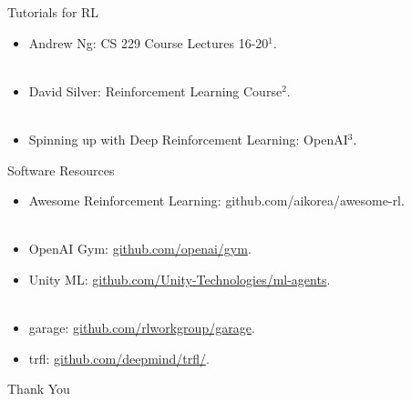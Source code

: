 \documentclass{beamer}
\begin{document}
\begin{frame}{Tutorials for RL}
    \begin{itemize}
        \item Andrew Ng: CS 229 Course Lectures 16-20$^1$.\\~
        \item David Silver: Reinforcement Learning Course$^2$.\\~
        \item Spinning up with Deep Reinforcement Learning: OpenAI$^3$.
        
    \end{itemize}
\end{frame}

\begin{frame}{Software Resources}
    \begin{itemize}
        \item Awesome Reinforcement Learning: {github.com/aikorea/awesome-rl}.\\~
        \item OpenAI Gym: \url{github.com/openai/gym}.
        \item Unity ML: \url{github.com/Unity-Technologies/ml-agents}.\\~
        \item garage: \url{github.com/rlworkgroup/garage}.
        \item trfl: \url{github.com/deepmind/trfl/}.
        
    \end{itemize}
\end{frame}

\begin{frame}[noframenumbering]
\Huge{\centerline{Thank You}}
\end{frame}
\end{document}
